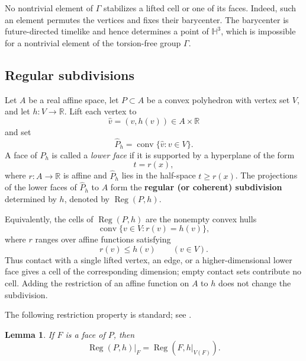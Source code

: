 \documentclass[oneside,a4paper,12pt]{article}
\newcommand{\R}{\mathbb R}
\renewcommand{\H}{\mathbb{H}}
\newcommand{\Reg}{\operatorname{Reg}}
\theoremstyle{plain}
\newtheorem{lemma}[theorem]{Lemma}
\theoremstyle{definition}
\theoremstyle{remark}
\numberwithin{equation}{section}
\begin{document}
No nontrivial element of $\Gamma$ stabilizes a lifted cell or one of its faces. Indeed, such an element permutes the vertices and fixes their barycenter. The barycenter is future-directed timelike and hence determines a point of $\H^3$, which is impossible for a nontrivial element of the torsion-free group $\Gamma$.

\subsection{Regular subdivisions}
Let $A$ be a real affine space, let $P\subset A$ be a convex polyhedron with vertex set $V$, and let $h:V\to\R$. Lift each vertex to
\begin{equation}
\widehat v=(v,h(v))\in A\times\R
  \nonumber
\end{equation}
and set
\begin{equation}
\widehat P_h=\operatorname{conv}\{\widehat v:v\in V\}.
  \nonumber
\end{equation}
A face of $\widehat P_h$ is called a \emph{lower face} if it is supported by a hyperplane of the form
\begin{equation}
t=r(x),
  \nonumber
\end{equation}
where $r:A\to\R$ is affine and $\widehat P_h$ lies in the half-space $t\geq r(x)$. The projections of the lower faces of $\widehat P_h$ to $A$ form the \textbf{regular (or coherent) subdivision} determined by $h$, denoted by $\Reg(P,h)$.

Equivalently, the cells of $\Reg(P,h)$ are the nonempty convex hulls
\begin{equation}
\operatorname{conv}\{v\in V:r(v)=h(v)\},
  \nonumber
\end{equation}
where $r$ ranges over affine functions satisfying
\begin{equation}
r(v)\leq h(v)\qquad(v\in V).
  \nonumber
\end{equation}
Thus contact with a single lifted vertex, an edge, or a higher-dimensional lower face gives a cell of the corresponding dimension; empty contact sets contribute no cell. Adding the restriction of an affine function on $A$ to $h$ does not change the subdivision.

The following restriction property is standard; see \cite[Lemma 2.3.15]{DRS}.

\begin{lemma}\label{lemma:restriction}
If $F$ is a face of $P$, then
\begin{equation}
\Reg(P,h)|_F=\Reg(F,h|_{V(F)}).
  \nonumber \end{equation}
\end{lemma}
\end{document}
